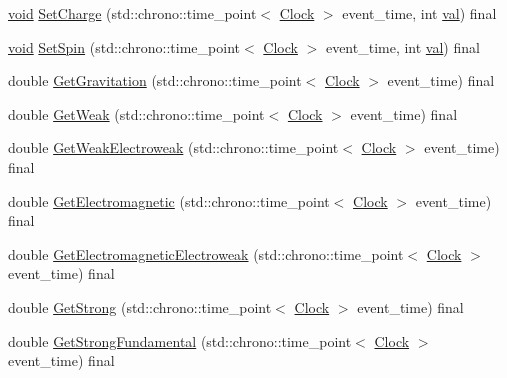 \begin{DoxyCompactItemize}
\item 
\mbox{\hyperlink{glad_8h_a950fc91edb4504f62f1c577bf4727c29}{void}} \mbox{\hyperlink{class_monomer_a1ee35c888318e590082e6cd1772bb430}{Set\+Charge}} (std\+::chrono\+::time\+\_\+point$<$ \mbox{\hyperlink{universe_8h_a0ef8d951d1ca5ab3cfaf7ab4c7a6fd80}{Clock}} $>$ event\+\_\+time, int \mbox{\hyperlink{glad_8h_a26942fd2ed566ef553eae82d2c109c8f}{val}}) final
\item 
\mbox{\hyperlink{glad_8h_a950fc91edb4504f62f1c577bf4727c29}{void}} \mbox{\hyperlink{class_monomer_ad24a86a4c1ac62d1b0ce8040d6b08adf}{Set\+Spin}} (std\+::chrono\+::time\+\_\+point$<$ \mbox{\hyperlink{universe_8h_a0ef8d951d1ca5ab3cfaf7ab4c7a6fd80}{Clock}} $>$ event\+\_\+time, int \mbox{\hyperlink{glad_8h_a26942fd2ed566ef553eae82d2c109c8f}{val}}) final
\item 
double \mbox{\hyperlink{class_monomer_aa5f7b901e15c9a9eb6e1c3564cd06e4f}{Get\+Gravitation}} (std\+::chrono\+::time\+\_\+point$<$ \mbox{\hyperlink{universe_8h_a0ef8d951d1ca5ab3cfaf7ab4c7a6fd80}{Clock}} $>$ event\+\_\+time) final
\item 
double \mbox{\hyperlink{class_monomer_ac2070d7e39cd0b2a00aa6023ffd51f55}{Get\+Weak}} (std\+::chrono\+::time\+\_\+point$<$ \mbox{\hyperlink{universe_8h_a0ef8d951d1ca5ab3cfaf7ab4c7a6fd80}{Clock}} $>$ event\+\_\+time) final
\item 
double \mbox{\hyperlink{class_monomer_aec6e42dde40c5b3142fab880eabb346a}{Get\+Weak\+Electroweak}} (std\+::chrono\+::time\+\_\+point$<$ \mbox{\hyperlink{universe_8h_a0ef8d951d1ca5ab3cfaf7ab4c7a6fd80}{Clock}} $>$ event\+\_\+time) final
\item 
double \mbox{\hyperlink{class_monomer_ad23f4829d66cb20401cc72a9d72ac320}{Get\+Electromagnetic}} (std\+::chrono\+::time\+\_\+point$<$ \mbox{\hyperlink{universe_8h_a0ef8d951d1ca5ab3cfaf7ab4c7a6fd80}{Clock}} $>$ event\+\_\+time) final
\item 
double \mbox{\hyperlink{class_monomer_a9b270cd1293bc9635813ead284bd3881}{Get\+Electromagnetic\+Electroweak}} (std\+::chrono\+::time\+\_\+point$<$ \mbox{\hyperlink{universe_8h_a0ef8d951d1ca5ab3cfaf7ab4c7a6fd80}{Clock}} $>$ event\+\_\+time) final
\item 
double \mbox{\hyperlink{class_monomer_aa35033340e88c46757d1d5ccba21a21e}{Get\+Strong}} (std\+::chrono\+::time\+\_\+point$<$ \mbox{\hyperlink{universe_8h_a0ef8d951d1ca5ab3cfaf7ab4c7a6fd80}{Clock}} $>$ event\+\_\+time) final
\item 
double \mbox{\hyperlink{class_monomer_a4bc8b39086260e26a196b28b4fc6667f}{Get\+Strong\+Fundamental}} (std\+::chrono\+::time\+\_\+point$<$ \mbox{\hyperlink{universe_8h_a0ef8d951d1ca5ab3cfaf7ab4c7a6fd80}{Clock}} $>$ event\+\_\+time) final

\end{DoxyCompactItemize}
